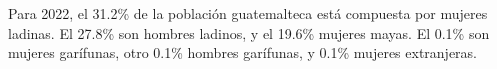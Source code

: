 Para 2022, el 31.2\% de la población guatemalteca está compuesta por mujeres ladinas. El 27.8\% son hombres ladinos, y el 19.6\% mujeres mayas. El 0.1\% son mujeres garífunas, otro 0.1\% hombres garífunas, y 0.1\% mujeres extranjeras.